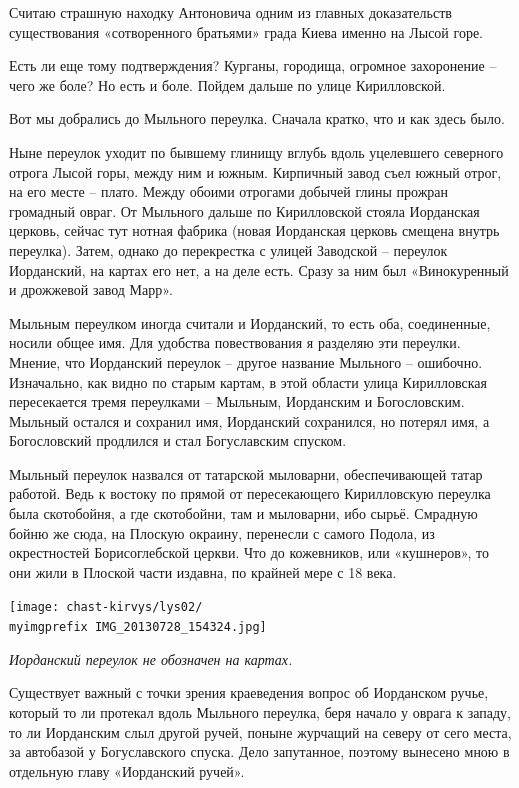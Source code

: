 Считаю страшную находку Антоновича одним из главных доказательств существования «сотворенного братьями» града Киева именно на Лысой горе.

Есть ли еще тому подтверждения? Курганы, городища, огромное захоронение – чего же боле? Но есть и боле. Пойдем дальше по улице Кирилловской.

Вот мы добрались до Мыльного переулка. Сначала кратко, что и как здесь было.

Ныне переулок уходит по бывшему глинищу вглубь вдоль уцелевшего северного отрога Лысой горы, между ним и южным. Кирпичный завод съел южный отрог, на его месте – плато. Между обоими отрогами добычей глины прожран громадный овраг. От Мыльного дальше по Кирилловской стояла Иорданская церковь, сейчас тут нотная фабрика (новая Иорданская церковь смещена внутрь переулка). Затем, однако до перекрестка с улицей Заводской – переулок Иорданский, на картах его нет, а на деле есть. Сразу за ним был «Винокуренный и дрожжевой завод Марр».

Мыльным переулком иногда считали и Иорданский, то есть оба, соединенные, носили общее имя. Для удобства повествования я разделяю эти переулки. Мнение, что Иорданский переулок – другое название Мыльного – ошибочно. Изначально, как видно по старым картам, в этой области улица Кирилловская пересекается тремя переулками – Мыльным, Иорданским и Богословским. Мыльный остался и сохранил имя, Иорданский сохранился, но потерял имя, а Богословский продлился и стал Богуславским спуском.

Мыльный переулок назвался от татарской мыловарни, обеспечивающей татар работой. Ведь к востоку по прямой от пересекающего Кирилловскую переулка была скотобойня, а где скотобойни, там и мыловарни, ибо сырьё. Смрадную бойню же сюда, на Плоскую окраину, перенесли с самого Подола, из окрестностей Борисоглебской церкви. Что до кожевников, или «кушнеров», то они жили в Плоской части издавна, по крайней мере с 18 века.

\begin{center}
\texttt{[image: chast-kirvys/lys02/\\myimgprefix IMG\_20130728\_154324.jpg]}

\textit{Иорданский переулок не обозначен на картах.}
\end{center}

Существует важный с точки зрения краеведения вопрос об Иорданском ручье, который то ли протекал вдоль Мыльного переулка, беря начало у оврага к западу, то ли Иорданским слыл другой ручей, поныне журчащий на северу от сего места, за автобазой у Богуславского спуска. Дело запутанное, поэтому вынесено мною в отдельную главу «Иорданский ручей».

